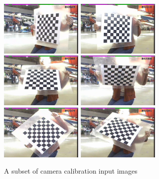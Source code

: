 \begin{figure}[h]
  \centering
  \includegraphics[width=4cm,keepaspectratio=true]{./Figures/camcal/camcal1_130.jpeg}
  \includegraphics[width=4cm,keepaspectratio=true]{./Figures/camcal/camcal1_140.jpeg}
  \includegraphics[width=4cm,keepaspectratio=true]{./Figures/camcal/camcal1_160.jpeg}
  \includegraphics[width=4cm,keepaspectratio=true]{./Figures/camcal/camcal1_180.jpeg}
  \includegraphics[width=4cm,keepaspectratio=true]{./Figures/camcal/camcal1_210.jpeg}
  \includegraphics[width=4cm,keepaspectratio=true]{./Figures/camcal/camcal1_240.jpeg}
  \caption{A subset of camera calibration input images}
  \label{fig:camcal}
\end{figure}

